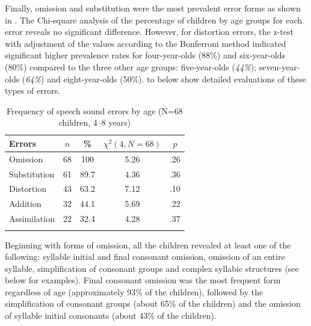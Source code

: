\documentclass[output=paper,newtxmath,modfonts,nonflat,draftmode]{langsci/langscibook}
\begin{document}
\clearpage Finally, omission and substitution were the most prevalent error forms as shown in . The Chi-square analysis of the percentage of children by age groups for each error reveals no significant difference. However, for distortion errors, the z-test with adjustment of the values according to the Bonferroni method indicated significant higher prevalence rates for four-year-olds (88\%) and six-year-olds (80\%) compared to the three other age groups: five-year-olds (\textit{44\%}); seven-year-olds (\textit{64\%}) and eight-year-olds (50\%).  to  below show detailed evaluations of these types of errors.

\begin{table}
\caption{Frequency of speech sound errors by age (N=68 children, 4--8 years)}
\label{tab:takam:7}
\begin{tabular}{lcS[table-format=2.1]S[table-format=1.2]S[table-format=1.2]}
\lsptoprule
Errors &  &   &  & \\
\midrule
{O}mission     & 68 & 100    & 5.26 & .26\\
{S}ubstitution & 61 & 89.7   & 4.36 & .36\\
{D}istortion   & 43 & 63.2   & 7.12 & .10\\
Addition       & 32 & 44.1   & 5.69 & .22\\
Assimilation   & 22 & 32.4   & 4.28 & .37\\
\lspbottomrule
\end{tabular}
\end{table}


Beginning with forms of omission, all the children revealed at least one of the following: syllable initial and final consonant omission, omission of an entire syllable, simplification of consonant groups and complex syllabic structures (see  below for examples). Final consonant omission was the most frequent form regardless of age (approximately 93\% of the children), followed by the simplification of consonant groups (about 65\% of the children) and the omission of syllable initial consonants (about 43\% of the children). 


\end{document}
